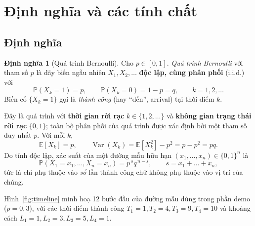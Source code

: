\documentclass[12pt,a4paper]{article}
\theoremstyle{definition}
\newtheorem{definition}{Định nghĩa}[section]
\theoremstyle{remark}
\newcommand{\Prob}{\mathbb{P}}
\newcommand{\E}{\mathbb{E}}
\newcommand{\Var}{\operatorname{Var}}
\begin{document}
\section{Định nghĩa và các tính chất}\label{sec:def}

\subsection{Định nghĩa}
\begin{definition}[Quá trình Bernoulli]\label{def:bern}
Cho $p\in[0,1]$. \emph{Quá trình Bernoulli} với tham số $p$ là dãy biến ngẫu nhiên $X_1, X_2, \dots$
\textbf{độc lập, cùng phân phối} (i.i.d.) với
\begin{equation}\label{eq:bern}
  \Prob(X_k = 1) = p, \qquad \Prob(X_k = 0) = 1-p = q, \qquad k = 1,2,\dots
\end{equation}
Biến cố $\{X_k = 1\}$ gọi là \emph{thành công} (hay ``đến'', arrival) tại thời điểm $k$.
\end{definition}

Đây là quá trình với \textbf{thời gian rời rạc} $k\in\{1,2,\dots\}$ và \textbf{không gian trạng thái rời rạc}
$\{0,1\}$; toàn bộ phân phối của quá trình được xác định bởi một tham số duy nhất $p$. Với mỗi $k$,
\begin{equation}\label{eq:bern-moments}
  \E[X_k] = p, \qquad \Var(X_k) = \E[X_k^2] - p^2 = p - p^2 = pq.
\end{equation}
Do tính độc lập, xác suất của một đường mẫu hữu hạn $(x_1,\dots,x_n)\in\{0,1\}^n$ là
\begin{equation}\label{eq:path-prob}
  \Prob(X_1 = x_1, \dots, X_n = x_n) = p^{\,s} q^{\,n-s}, \qquad s = x_1 + \dots + x_n,
\end{equation}
tức là chỉ phụ thuộc vào \emph{số} lần thành công chứ không phụ thuộc vào vị trí của chúng.

Hình~\ref{fig:timeline} minh hoạ 12 bước đầu của đường mẫu dùng trong phần demo ($p = 0{,}3$), với các thời
điểm thành công $T_1=1, T_2=4, T_3=9, T_4=10$ và khoảng cách $L_1=1, L_2=3, L_3=5, L_4=1$.
\end{document}
